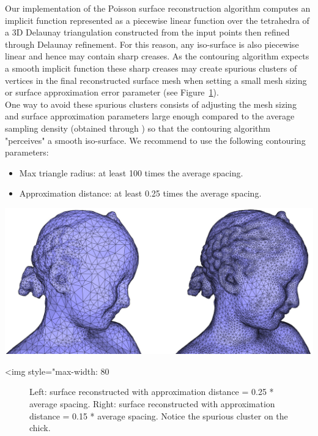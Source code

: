 Our implementation of the Poisson surface reconstruction algorithm computes an implicit function represented as a piecewise linear function over the tetrahedra of a 3D Delaunay triangulation constructed from the input points then refined through Delaunay refinement. For this reason, any iso-surface is also piecewise linear and hence may contain sharp creases. As the contouring algorithm  expects a smooth implicit function these sharp creases may create spurious clusters of vertices in the final reconstructed surface mesh when setting a small mesh sizing or surface approximation error parameter (see Figure~\ref{Surface_reconstruction_points_3-fig-contouring_bad}).\\
One way to avoid these spurious clusters consists of adjusting the mesh sizing and surface approximation parameters large enough compared to the average sampling density (obtained through ) so that the contouring algorithm "perceives" a smooth iso-surface. We recommend to use the following contouring parameters:
\begin{itemize}
\item Max triangle radius: at least 100 times the average spacing.
\item Approximation distance: at least 0.25 times the average spacing.
\end{itemize}

\begin{center}
    \begin{ccTexOnly}
        \includegraphics[width=1.0\textwidth]{Surface_reconstruction_points_3/contouring_bad}
    \end{ccTexOnly}
    \begin{ccHtmlOnly}
        <img style="max-width: 80%
    \end{ccHtmlOnly}
    \begin{figure}[h]
        \caption{Left: surface reconstructed with approximation
                 distance = 0.25 * average spacing.
                 Right: surface reconstructed with approximation
                 distance = 0.15 * average spacing.
                 Notice the spurious cluster on the chick.}
        \label{Surface_reconstruction_points_3-fig-contouring_bad}
    \end{figure}
\end{center}


